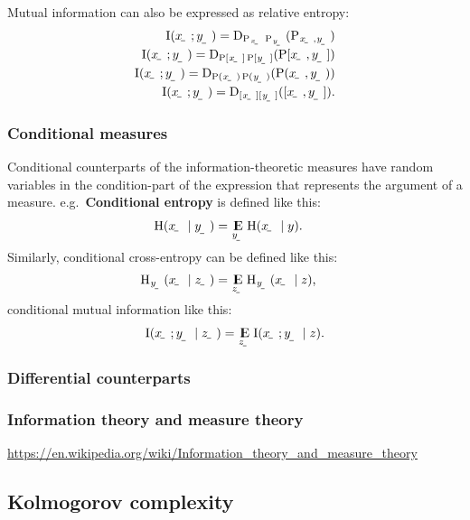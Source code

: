 \documentclass[twocolumn]{article}
\begin{document}
Mutual information can also be expressed as relative entropy:
\begin{align}
    \I(\rvar x; \rvar y) = \Dist_{\P_{\rvar x}\P_\rvar{y}}(\P_{\rvar x,\rvar y}) \\
    \I(\rvar x; \rvar y) = \Dist_{\P[\rvar x]\P[\rvar y]}(\P[\rvar x,\rvar y]) \\
    \I(\rvar x; \rvar y) = \Dist_{\P(\rvar x)\P(\rvar y)}(\P(\rvar x,\rvar y)) \\
    \I(\rvar x; \rvar y) = \Dist_{[\rvar x][\rvar y]}([\rvar x,\rvar y]) \text.
\end{align}

\subsubsection{Conditional measures}

Conditional counterparts of the information-theoretic measures have random variables in the condition-part of the expression that represents the argument of a measure. e.g.\ \textbf{Conditional entropy} is defined like this:
\begin{align}
    \H(\rvar x\mid\rvar y) &= \E_{\rvar y}\H(\rvar x\mid y) \text.
\end{align}
Similarly, conditional cross-entropy can be defined like this:
\begin{align}
    \H_\rvar{y}(\rvar x\mid\rvar z) &= \E_\rvar{z}\H_\rvar{y}(\rvar x\mid z) \text,
\end{align}
conditional mutual information like this:
\begin{align}
    \I(\rvar x; \rvar y\mid \rvar z) = \E_\rvar{z}\I\del{\rvar x; \rvar y \mid z} \text.
\end{align}

\subsubsection{Differential counterparts}

\subsubsection{Information theory and measure theory}

\url{https://en.wikipedia.org/wiki/Information_theory_and_measure_theory}

\subsection{Kolmogorov complexity}
\end{document}
